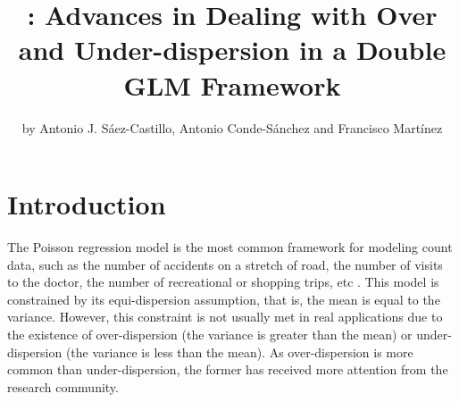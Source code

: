 \title{: Advances in Dealing with Over and Under-dispersion in a Double GLM Framework}
\author{by Antonio J. S\'{a}ez-Castillo, Antonio Conde-S\'{a}nchez and Francisco Mart\'{i}nez}

\maketitle



\section{Introduction}

The Poisson regression model is the most common framework for modeling count data, such as the number of accidents on a stretch of road, the number of visits to the doctor, the number of recreational or shopping trips, etc \citep{cameron_trivedi_2013,hilbe_2011,Winkelmann2008}. This model is constrained by its equi-dispersion assumption, that is, the mean is equal to the variance. However, this constraint is not usually met in real applications due to the existence of over-dispersion (the variance is greater than the mean) or under-dispersion (the variance is less than the mean). As over-dispersion is more common than under-dispersion, the former has received more attention from the research community.

